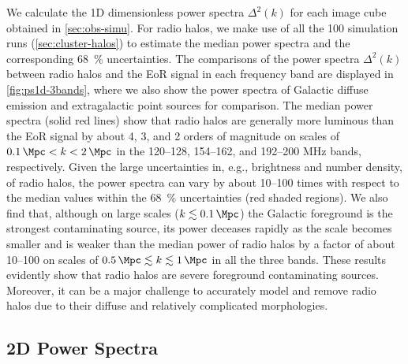 \documentclass[twocolumn]{aastex62}
\begin{document}
We calculate the 1D dimensionless power spectra $\Delta^2(k)$ for each
image cube obtained in \autoref{sec:obs-simu}.
For radio halos, we make use of all the 100 simulation runs
(\autoref{sec:cluster-halos}) to estimate the median power spectra and
the corresponding \SI{68}{\percent} uncertainties.
The comparisons of the power spectra $\Delta^2(k)$ between radio halos
and the EoR signal in each frequency band are displayed
in \autoref{fig:ps1d-3bands}, where we also show the power spectra of
Galactic diffuse emission and extragalactic point sources for comparison.
The median power spectra (solid red lines) show that radio halos are
generally more luminous than the EoR signal by about 4, 3, and 2 orders
of magnitude on scales of $\SI{0.1}{\per\Mpc} < k < \SI{2}{\per\Mpc}$
in the \numrange{120}{128}, \numrange{154}{162}, and \numrange{192}{200}
\si{\MHz} bands, respectively.
Given the large uncertainties in, e.g., brightness and number density,
of radio halos, the power spectra can vary by about \numrange{10}{100}
times with respect to the median values within the \SI{68}{\percent}
uncertainties (red shaded regions).
We also find that, although on large scales
($k \lesssim \SI{0.1}{\per\Mpc}$) the Galactic foreground is the
strongest contaminating source, its power deceases rapidly as the
scale becomes smaller and is weaker than the median power of radio halos
by a factor of about \numrange{10}{100} on scales of
$\SI{0.5}{\per\Mpc} \lesssim k \lesssim \SI{1}{\per\Mpc}$
in all the three bands.
These results evidently show that radio halos are severe foreground
contaminating sources.
Moreover, it can be a major challenge to accurately model and remove radio
halos due to their diffuse and relatively complicated morphologies.


\subsection{2D Power Spectra}
\label{sec:ps2d}
\end{document}
